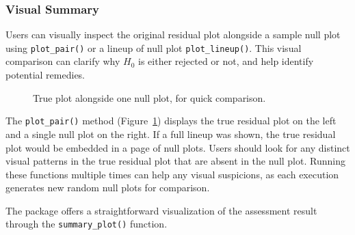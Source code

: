 \documentclass[
doublespace,
  times]{anzsauth}
\newenvironment{Shaded}{\begin{snugshade}}{\end{snugshade}}
\newcommand{\FunctionTok}[1]{\textcolor[rgb]{0.28,0.35,0.67}{#1}}
\newcommand{\NormalTok}[1]{\textcolor[rgb]{0.00,0.23,0.31}{#1}}
\newcommand{\SpecialCharTok}[1]{\textcolor[rgb]{0.37,0.37,0.37}{#1}}
\begin{document}
\subsubsection{Visual Summary}\label{sec-autovi-visual}

Users can visually inspect the original residual plot alongside a sample
null plot using \texttt{plot\_pair()} or a lineup of null plot
\texttt{plot\_lineup()}. This visual comparison can clarify why \(H_0\)
is either rejected or not, and help identify potential remedies.

\begin{Shaded}
\end{Shaded}

\begin{figure}[H]


\caption{\label{fig-plot-pair}True plot alongside one null plot, for
quick comparison.}

\end{figure}%

The \texttt{plot\_pair()} method (Figure~\ref{fig-plot-pair}) displays
the true residual plot on the left and a single null plot on the right.
If a full lineup was shown, the true residual plot would be embedded in
a page of null plots. Users should look for any distinct visual patterns
in the true residual plot that are absent in the null plot. Running
these functions multiple times can help any visual suspicions, as each
execution generates new random null plots for comparison.

The package offers a straightforward visualization of the assessment
result through the \texttt{summary\_plot()} function.
\end{document}
